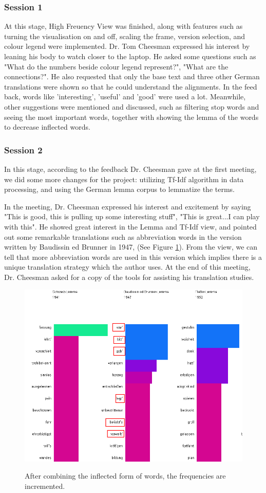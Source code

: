 \subsubsection{Session 1}

At this stage, High Freuency View was finished, along with features such as turning the visualisation on and off, scaling the frame, version selection, and colour legend were implemented. Dr. Tom Cheesman expressed his interest by leaning his body to watch closer to 
the laptop. He asked some questions such as "What do the numbers beside colour legend represent?", "What are the connections?". He also requested that only the base text and three other German translations were shown so that he could understand the alignments. In the feed back, words like 'interesting', 'useful' and 'good' were used a lot. Meanwhile, other suggestions were mentioned and discussed, such as filtering stop words and seeing the most important words, together with showing the lemma of the words to decrease inflected words.

\subsubsection{Session 2}

In this stage, according to the feedback Dr. Cheesman gave at the first meeting, we did some more changes for the project: utilizing Tf-Idf algorithm in data processing, and using the German lemma corpus to lemmatize the terms. 

In the meeting, Dr. Cheesman expressed his interest and excitement by saying "This is good, this is pulling up some interesting stuff", "This is great...I can play with this". He showed great interest in the Lemma and Tf-Idf view, and pointed out some remarkable translations such as abbreviation words in the version written by Baudissin ed Brunner in 1947, (See Figure \ref{fig:feedback}). From the view, we can tell that more abbreviation words are used in this version which implies there is a unique translation strategy which the author uses. At the end of this meeting, Dr. Cheesman asked for a copy of the tools for assisting his translation studies.

\begin{figure}[H]
	\centering	
	\includegraphics[scale=0.5]{Figs/Marking-Feedback}\\[1ex]
	\caption{After combining the inflected form of words, the frequencies are incremented.} 
	\label{fig:feedback}
\end{figure} 




